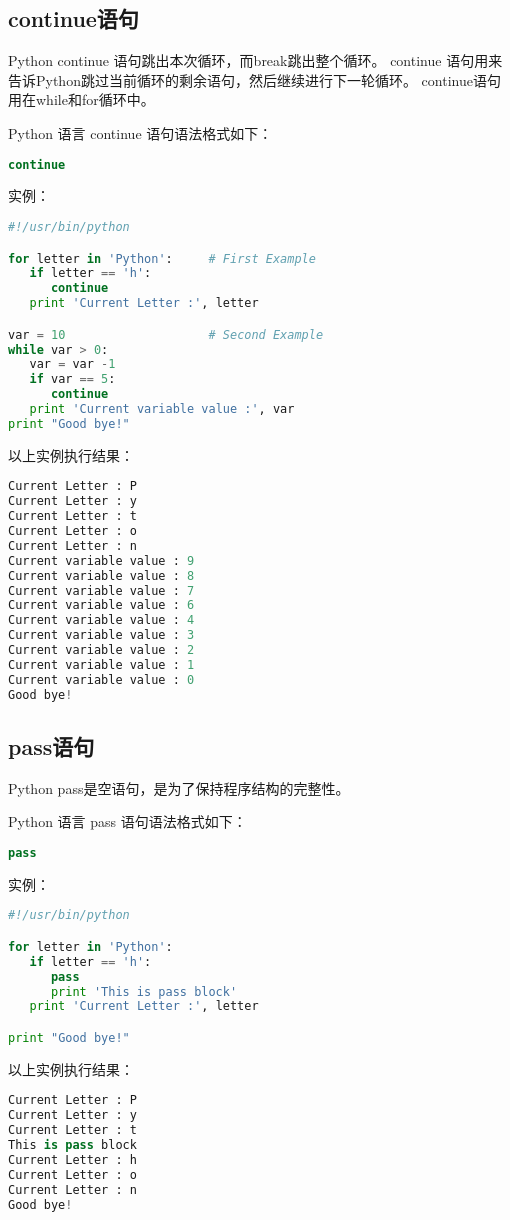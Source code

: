 \subsection{continue语句}
Python continue 语句跳出本次循环，而break跳出整个循环。
continue 语句用来告诉Python跳过当前循环的剩余语句，然后继续进行下一轮循环。
continue语句用在while和for循环中。

Python 语言 continue 语句语法格式如下：
\begin{lstlisting}[language=Python]
continue
\end{lstlisting}
实例：
\begin{lstlisting}[language=Python]
#!/usr/bin/python

for letter in 'Python':     # First Example
   if letter == 'h':
      continue
   print 'Current Letter :', letter

var = 10                    # Second Example
while var > 0:              
   var = var -1
   if var == 5:
      continue
   print 'Current variable value :', var
print "Good bye!"
\end{lstlisting}
以上实例执行结果：
\begin{lstlisting}[language=Python]
Current Letter : P
Current Letter : y
Current Letter : t
Current Letter : o
Current Letter : n
Current variable value : 9
Current variable value : 8
Current variable value : 7
Current variable value : 6
Current variable value : 4
Current variable value : 3
Current variable value : 2
Current variable value : 1
Current variable value : 0
Good bye!
\end{lstlisting}


\subsection{pass语句}
Python pass是空语句，是为了保持程序结构的完整性。

Python 语言 pass 语句语法格式如下：
\begin{lstlisting}[language=Python]
pass
\end{lstlisting}
实例：
\begin{lstlisting}[language=Python]
#!/usr/bin/python

for letter in 'Python': 
   if letter == 'h':
      pass
      print 'This is pass block'
   print 'Current Letter :', letter

print "Good bye!"
\end{lstlisting}
以上实例执行结果：
\begin{lstlisting}[language=Python]
Current Letter : P
Current Letter : y
Current Letter : t
This is pass block
Current Letter : h
Current Letter : o
Current Letter : n
Good bye!
\end{lstlisting}



